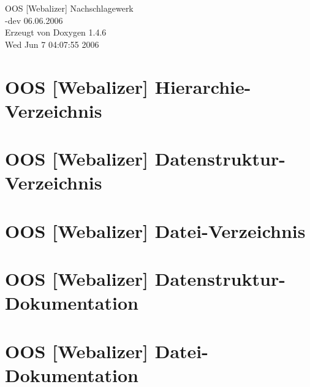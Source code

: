 \documentclass[a4paper]{book}
\begin{document}
\begin{titlepage}
\vspace*{7cm}
\begin{center}
{\Large OOS [Webalizer] Nachschlagewerk\\[1ex]\large -dev 06.06.2006 }\\
\vspace*{1cm}
{\large Erzeugt von Doxygen 1.4.6}\\
\vspace*{0.5cm}
{\small Wed Jun 7 04:07:55 2006}\\
\end{center}
\end{titlepage}
\clearemptydoublepage
{}
\tableofcontents
\clearemptydoublepage
{}
\chapter{OOS [Webalizer] Hierarchie-Verzeichnis}

\chapter{OOS [Webalizer] Datenstruktur-Verzeichnis}

\chapter{OOS [Webalizer] Datei-Verzeichnis}

\chapter{OOS [Webalizer] Datenstruktur-Dokumentation}














\chapter{OOS [Webalizer] Datei-Dokumentation}

















\printindex
\end{document}
